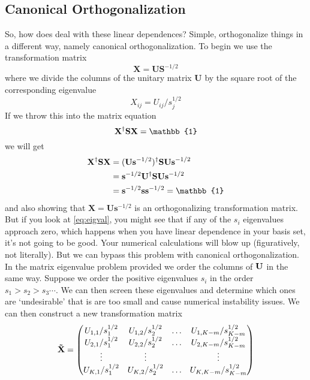\documentclass[11pt]{article}
\begin{document}
\subsection{Canonical Orthogonalization}
So, how does deal with these linear dependences? Simple, orthogonalize things in a different way, namely canonical orthogonalization. To begin we use the transformation matrix 
\begin{equation}
\mathbf{X} = \mathbf{U} \mathbf{S}^{-1/2}
\end{equation}
where we divide the columns of the unitary matrix $\mathbf{U}$ by the square root of the corresponding eigenvalue 
\begin{equation}\label{eq:eigval}
X_{ij} = U_{ij}/s_j^{1/2}
\end{equation}
If we throw this into the matrix equation
\begin{equation}\label{eq:frmoset}
\bf {X}^\t {SX} = \mathbb{1}
\end{equation}
we will get
\begin{align*}
\mathbf{X}^\t \mathbf{SX} &= (\mathbf{U}\mathbf{s}^{-1/2})^\t \mathbf{SUs}^{-1/2} \\
&= \mathbf{s}^{-1/2}\mathbf{U}^\t \mathbf{SU}\mathbf{s}^{-1/2}\\
&= \mathbf{s}^{-1/2}\mathbf{s}\mathbf{s}^{-1/2} = \mathbb{1}
\end{align*}
and also showing that $ \mathbf{X}=\mathbf{U}\mathbf{s}^{-1/2}$ is an orthogonalizing transformation matrix. But if you look at \eqref{eq:eigval}, you might see that if any of the $s_i$ eigenvalues approach zero, which happens when you have linear dependence in your basis set, it's not going to be good. Your numerical calculations will blow up (figuratively, not literally). But we can bypass this problem with canonical orthogonalization. In the matrix eigenvalue problem provided we order the columns of $\bf U$ in the same way. Suppose we order the positive eigenvalues $s_i$ in the order $s_1 > s_2 > s_3 \cdots $. We can then screen these eigenvalues and determine which ones are `undesirable' that is are too small and cause numerical instability issues. We can then construct a new transformation matrix 
\begin{equation}\label{}
\mathbf{ \tilde{X}} = \mqty( U_{1,1}/s_1^{1/2} &U_{1,2}/s_2^{1/2} & \dots & U_{1,K-m}/s_{K-m}^{1/2} \\
U_{2,1}/s_1^{1/2} &U_{2,2}/s_2^{1/2} & \dots& U_{2,K-m}/s_{K-m}^{1/2}  \\
\vdots & \vdots & & \vdots \\
U_{K,1}/s_1^{1/2} &U_{K,2}/s_2^{1/2} & \dots &U_{K,K-m}/s_{K-m}^{1/2} 
)
\end{equation}
\end{document}
